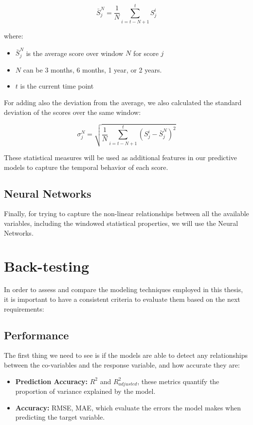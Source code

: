 \documentclass[11pt,english,a4paper,hidelinks]{book}
\begin{document}
\begin{equation}
    \bar{S}_j^N = \frac{1}{N} \sum_{i=t-N+1}^{t} S_j^i
\end{equation}

\noindent where:
\begin{itemize}
    \item \(\bar{S}_j^N\) is the average score over window \(N\) for score \(j\)
    \item \(N\) can be 3 months, 6 months, 1 year, or 2 years.
    \item \(t\) is the current time point
\end{itemize}

\noindent For adding also the deviation from the average, we also calculated the standard deviation of the scores over the same window:

\begin{equation}
    \sigma_j^N = \sqrt{\frac{1}{N} \sum_{i=t-N+1}^{t} (S_j^i - \bar{S}_j^N)^2}
\end{equation}

\noindent These statistical measures will be used as additional features in our predictive models to capture the temporal behavior of each score.

\subsection{Neural Networks}

Finally, for trying to capture the non-linear relationships between all the available variables, including the windowed statistical properties, we will use the Neural Networks.

\section{Back-testing}

In order to assess and compare the modeling techniques employed in this thesis, it is important to have a consistent criteria to evaluate them based on the next requirements:

\subsection{Performance}
The first thing we need to see is if the models are able to detect any relationships between the co-variables and the response variable, and how accurate they are:
\begin{itemize}
    \item \textbf{Prediction Accuracy:} $R^2$ and $R^2_{adjusted}$, these metrics quantify the proportion of variance explained by the model.
    \item \textbf{Accuracy:} RMSE, MAE, which evaluate the errors the model makes when predicting the target variable.
\end{itemize}
\end{document}
